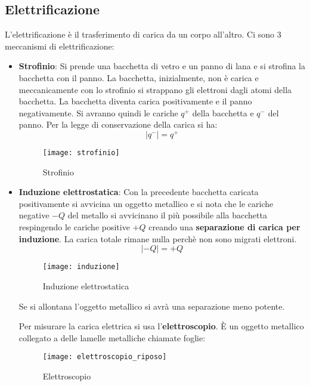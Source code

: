 \documentclass[a4paper]{article}
\begin{document}
\subsection{Elettrificazione}
L'elettrificazione è il trasferimento di carica da un corpo all'altro. Ci sono 3 
meccanismi di elettrificazione:
\begin{itemize}
  \item \textbf{Strofinio}:
    Si prende una bacchetta di vetro e un panno di lana e si strofina la bacchetta con il panno.
    La bacchetta, inizialmente, non è carica e meccanicamente con lo strofinio si strappano
    gli elettroni dagli atomi della bacchetta. La bacchetta diventa carica positivamente e
    il panno negativamente. Si avranno quindi le cariche \( q^+ \) della bacchetta e
    \( q^- \) del panno. Per la legge di conservazione della carica si ha:
    \[
      |q^-| = q^+
    \] 
    \begin{figure}[H]
      \centering
      \texttt{[image: strofinio]}
      \caption{Strofinio}
    \end{figure}
  \item \textbf{Induzione elettrostatica}:
    Con la precedente bacchetta caricata positivamente si avvicina un oggetto metallico e
    si nota che le cariche negative \( -Q \)  del metallo si avvicinano il più possibile 
    alla bacchetta respingendo le cariche positive \( +Q \)  creando una 
    \textbf{separazione di carica per induzione}. La carica totale rimane nulla perchè 
    non sono migrati elettroni.
    \[
      |-Q| = +Q
    \] 
    \begin{figure}[H]
      \centering
      \texttt{[image: induzione]}
      \caption{Induzione elettrostatica}
    \end{figure}
    \noindent
    Se si allontana l'oggetto metallico si avrà una separazione meno potente.

    \vspace{1em}
    \noindent
    Per misurare la carica elettrica si usa l'\textbf{elettroscopio}. È un oggetto metallico
    collegato a delle lamelle metalliche chiamate foglie:
    \begin{figure}[H]
      \centering
      \texttt{[image: elettroscopio\_riposo]}
      \caption{Elettroscopio}
    \end{figure}


\end{itemize}
\end{document}
